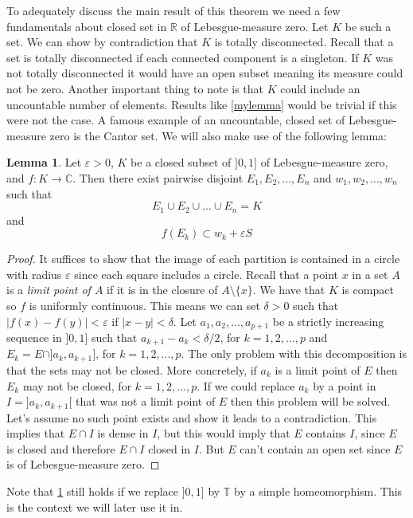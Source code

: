 \documentclass[a4paper,12pt,twoside,BCOR=10mm]{scrbook}
\theoremstyle{definition}
\theoremstyle{definition}
\newtheorem{lemma}[theorem]{Lemma}
\theoremstyle{definition}
\begin{document}
To adequately discuss the main result of this theorem we need a few fundamentals about closed set in $\mathbb{R}$ of Lebesgue-measure zero.
Let $K$ be such a set.
We can show by contradiction that $K$ is totally disconnected.
Recall that a set is totally disconnected if each connected component is a singleton.
If $K$ was not totally disconnected it would have an open subset meaning its measure could not be zero.
Another important thing to note is that $K$ could include an uncountable number of elements.
Results like \ref{mylemma} would be trivial if this were not the case.
A famous example of an uncountable, closed set of Lebesgue-measure zero is the Cantor set.
We will also make use of the following lemma:
\begin{lemma}
\label{somelemma}
Let
	$\varepsilon > 0$,
	$K$ be a closed subset of $]0, 1]$ of Lebesgue-measure zero,
	and $f: K \rightarrow \mathbb{C}$.
Then there exist pairwise disjoint $E_1, E_2, ..., E_n$ and $w_1, w_2, ..., w_n$ such that 
\[
	E_1 \cup E_2 \cup ... \cup E_n = K
\]
and
\[
	f(E_k) \subset w_k + \varepsilon S \tag*{$k = 1, 2, ..., n$.}
\]
\end{lemma}
\begin{proof}
It suffices to show that the image of each partition is contained in a circle with radius $\varepsilon$ since each square includes a circle.
Recall that a point $x$ in a set $A$ is a \emph{limit point of $A$} if it is in the closure of $A \setminus \{x\}$.
We have that $K$ is compact so $f$ is uniformly continuous.
This means we can set $\delta > 0$ such that $|f(x) - f(y)| < \varepsilon$ if $|x - y| < \delta$.
Let $a_1, a_2, ..., a_{p + 1}$ be a strictly increasing sequence in $]0, 1]$ such that $a_{k + 1} - a_k < \delta/2$, for $k = 1, 2, ..., p$ and $E_k = E \cap ]a_k, a_{k + 1}]$, for $k = 1, 2, ..., p$.
The only problem with this decomposition is that the sets may not be closed.
More concretely, if $a_k$ is a limit point of $E$ then $E_k$ may not be closed, for $k = 1, 2, ..., p$.
If we could replace $a_k$ by a point in $I = ]a_k, a_{k + 1}[$ that was not a limit point of $E$ then this problem will be solved.
Let's assume no such point exists and show it leads to a contradiction.
This implies that $E \cap I$ is dense in $I$, but this would imply that $E$ contains $I$, since $E$ is closed and therefore $E \cap I$ closed in $I$.
But $E$ can't contain an open set since $E$ is of Lebesgue-measure zero.
\end{proof}
Note that \ref{somelemma} still holds if we replace $]0, 1]$ by $\mathbb{T}$ by a simple homeomorphism.
This is the context we will later use it in.
\end{document}
